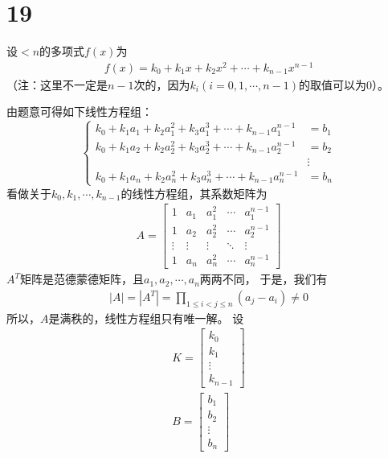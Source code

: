 \documentclass{article}
\begin{document}
\section*{19}

设$<n$的多项式$f(x)$为
\begin{align*}
  f(x) = k_0 + k_1 x + k_2 x^2 + \cdots + k_{n-1} x^{n-1}
\end{align*}
（注：这里不一定是$n-1$次的，因为$k_i(i = 0, 1, \cdots, n-1)$的取值可以为0）。

由题意可得如下线性方程组：
\begin{equation*}
  \begin{cases}
    k_0 + k_1 a_1 + k_2 a_1^2 + k_3 a_1^3 + \cdots + k_{n-1} a_1^{n-1} & = b_1  \\
    k_0 + k_1 a_2 + k_2 a_2^2 + k_3 a_2^3 + \cdots + k_{n-1} a_2^{n-1} & = b_2  \\
                                                                       & \vdots \\
    k_0 + k_1 a_n + k_2 a_n^2 + k_3 a_n^3 + \cdots + k_{n-1} a_n^{n-1} & = b_n
  \end{cases}
\end{equation*}
看做关于$k_0, k_1, \cdots, k_{n-1}$的线性方程组，其系数矩阵为
\begin{align*}
  A = \begin{bmatrix}
        1      & a_1    & a_1^2  & \cdots & a_1^{n-1} \\
        1      & a_2    & a_2^2  & \cdots & a_2^{n-1} \\
        \vdots & \vdots & \vdots & \ddots & \vdots    \\
        1      & a_n    & a_n^2  & \cdots & a_n^{n-1}
      \end{bmatrix}
\end{align*}
$A^T$矩阵是范德蒙德矩阵，且$a_1, a_2, \cdots, a_n$两两不同，
于是，我们有
\begin{align*}
  |A| = |A^T| = \prod\limits_{1 \leq i < j \leq n} (a_j - a_i) \neq 0
\end{align*}
所以，$A$是满秩的，线性方程组只有唯一解。
设
\begin{align*}
  K = \begin{bmatrix}
        k_0    \\
        k_1    \\
        \vdots \\
        k_{n-1}
      \end{bmatrix} \\
  B = \begin{bmatrix}
        b_1    \\
        b_2    \\
        \vdots \\
        b_n
      \end{bmatrix}
\end{align*}
\end{document}
